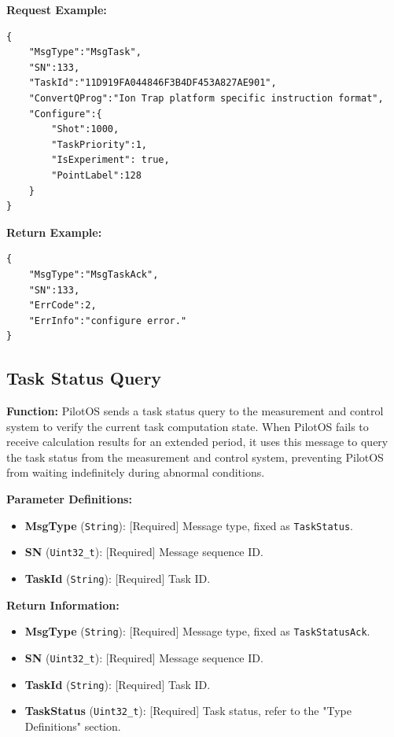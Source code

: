 \documentclass[12pt, a4paper]{article}
\begin{document}
\noindent \textbf{Request Example:}
\begin{lstlisting}
{
    "MsgType":"MsgTask",
    "SN":133,
    "TaskId":"11D919FA044846F3B4DF453A827AE901",
    "ConvertQProg":"Ion Trap platform specific instruction format",
    "Configure":{
        "Shot":1000,
        "TaskPriority":1,
        "IsExperiment": true,
        "PointLabel":128
    }
}
\end{lstlisting}

\noindent \textbf{Return Example:}
\begin{lstlisting}
{
    "MsgType":"MsgTaskAck",
    "SN":133,
    "ErrCode":2,
    "ErrInfo":"configure error."
}
\end{lstlisting}

\subsection{Task Status Query}

\textbf{Function:} PilotOS sends a task status query to the measurement and control system to verify the current task computation state. When PilotOS fails to receive calculation results for an extended period, it uses this message to query the task status from the measurement and control system, preventing PilotOS from waiting indefinitely during abnormal conditions.

\textbf{Parameter Definitions:}
\begin{itemize}
    \item \textbf{MsgType} (\texttt{String}): [Required] Message type, fixed as \texttt{TaskStatus}.
    \item \textbf{SN} (\texttt{Uint32\_t}): [Required] Message sequence ID.
    \item \textbf{TaskId} (\texttt{String}): [Required] Task ID.
\end{itemize}

\textbf{Return Information:}
\begin{itemize}
    \item \textbf{MsgType} (\texttt{String}): [Required] Message type, fixed as \texttt{TaskStatusAck}.
    \item \textbf{SN} (\texttt{Uint32\_t}): [Required] Message sequence ID.
    \item \textbf{TaskId} (\texttt{String}): [Required] Task ID.
    \item \textbf{TaskStatus} (\texttt{Uint32\_t}): [Required] Task status, refer to the "Type Definitions" section.
\end{itemize}
\end{document}
